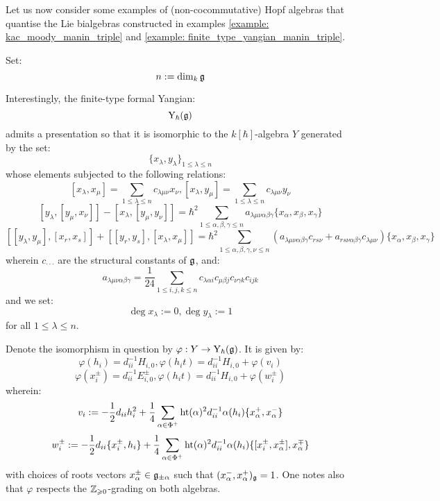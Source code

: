         Let us now consider some examples of (non-cocommutative) Hopf algebras that quantise the Lie bialgebras constructed in examples \ref{example: kac_moody_manin_triple} and \ref{example: finite_type_yangian_manin_triple}.
        \begin{example} \label{example: finite_type_QUEs}
            
        \end{example}
        \begin{example} \label{example: finite_type_yangians}
            Set:
                $$n := \dim_k \mathfrak{g}$$
        
            Interestingly, the finite-type formal Yangian:
                $$\mathrm{Y}_{\hbar}(\mathfrak{g})$$
            admits a presentation so that it is isomorphic to the $k[\hbar]$-algebra $Y$ generated by the set:
                $$\{ x_{\lambda}, y_{\lambda} \}_{1 \leq \lambda \leq n}$$
            whose elements subjected to the following relations:
                $$[ x_{\lambda}, x_{\mu} ] = \sum_{1 \leq \lambda \leq n} c_{\lambda \mu \nu} x_{\nu}, [ x_{\lambda}, y_{\mu} ] = \sum_{1 \leq \lambda \leq n} c_{\lambda \mu \nu} y_{\nu}$$
                $$[ y_{\lambda}, [y_{\mu}, x_{\nu}] ] - [ x_{\lambda}, [y_{\mu}, y_{\nu}] ] = \hbar^2 \sum_{1 \leq \alpha, \beta, \gamma \leq n} a_{\lambda \mu \nu \alpha \beta \gamma} \{ x_{\alpha}, x_{\beta}, x_{\gamma} \}$$
                $$[ [y_{\lambda}, y_{\mu}], [x_r, x_s] ] + [ [y_r, y_s], [x_{\lambda}, x_{\mu}] ] = \hbar^2 \sum_{1 \leq \alpha, \beta, \gamma, \nu \leq n} ( a_{\lambda \mu \nu \alpha \beta \gamma} c_{r s \nu} + a_{r s \nu \alpha \beta \gamma} c_{\lambda \mu \nu} ) \{ x_{\alpha}, x_{\beta}, x_{\gamma} \}$$
            wherein $c_{\cdot \cdot \cdot}$ are the structural constants of $\mathfrak{g}$, and:
                $$a_{\lambda \mu \nu \alpha \beta \gamma} = \frac{1}{24} \sum_{1 \leq i, j, k \leq n} c_{\lambda \alpha i} c_{\mu \beta j} c_{\nu \gamma k} c_{i j k}$$
            and we set:
                $$\deg x_{\lambda} := 0, \deg y_{\lambda} := 1$$
            for all $1 \leq \lambda \leq n$.
            
            Denote the isomorphism in question by $\varphi: Y \to \mathrm{Y}_{\hbar}(\mathfrak{g})$. It is given by:
                $$\varphi(h_i) = d_{ii}^{-1} H_{i, 0}, \varphi(h_i t) = d_{ii}^{-1} H_{i, 0} + \varphi(v_i)$$
                $$\varphi(x_i^{\pm}) = d_{ii}^{-1} E_{i, 0}^{\pm}, \varphi(h_i t) = d_{ii}^{-1} H_{i, 0} + \varphi(w_i^{\pm})$$
            wherein:
                $$v_i := -\frac12 d_{ii} h_i^2 + \frac14 \sum_{\alpha \in \Phi^+} \operatorname{ht}(\alpha)^2 d_{ii}^{-1} \alpha(h_i) \{x_{\alpha}^+, x_{\alpha}^-\}$$
                $$w_i^{\pm} := -\frac12 d_{ii} \{x_i^{\pm}, h_i\} + \frac14 \sum_{\alpha \in \Phi^+} \operatorname{ht}(\alpha)^2 d_{ii}^{-1} \alpha(h_i) \{[x_i^{\pm}, x_{\alpha}^{\pm}], x_{\alpha}^{\mp}\}$$
            with choices of roots vectors $x_{\alpha}^{\pm} \in \mathfrak{g}_{\pm \alpha}$ such that $(x_{\alpha}^-, x_{\alpha}^+)_{\mathfrak{g}} = 1$. One notes also that $\varphi$ respects the $\mathbb{Z}_{\geqslant 0}$-grading on both algebras.
        

\end{example}
